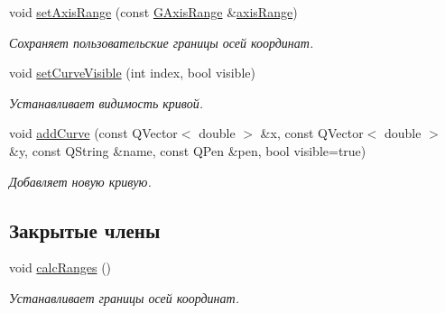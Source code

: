 \begin{DoxyCompactItemize}
\hypertarget{class_graph_sheet_ae37cc5b56c35ae34ced47c6f21eebf45}{}\label{class_graph_sheet_ae37cc5b56c35ae34ced47c6f21eebf45} 
void \hyperlink{class_graph_sheet_ae37cc5b56c35ae34ced47c6f21eebf45}{set\+Axis\+Range} (const \hyperlink{struct_g_axis_range}{G\+Axis\+Range} \&\hyperlink{class_graph_sheet_ac13787fb3357ea7d4f3ee3aa4351b0d7}{axis\+Range})
\begin{DoxyCompactList}\small\item\em Сохраняет пользовательские границы осей координат. \end{DoxyCompactList}\item 
void \hyperlink{class_graph_sheet_af8f3efaf2a6ba860b089bef15e07f403}{set\+Curve\+Visible} (int index, bool visible)
\begin{DoxyCompactList}\small\item\em Устанавливает видимость кривой. \end{DoxyCompactList}\item 
void \hyperlink{class_graph_sheet_abce999772aca9f5da197f13fd8912362}{add\+Curve} (const Q\+Vector$<$ double $>$ \&x, const Q\+Vector$<$ double $>$ \&y, const Q\+String \&name, const Q\+Pen \&pen, bool visible=true)
\begin{DoxyCompactList}\small\item\em Добавляет новую кривую. \end{DoxyCompactList}\end{DoxyCompactItemize}
\subsection*{Закрытые члены}
\begin{DoxyCompactItemize}
\item 
void \hyperlink{class_graph_sheet_adc73499b0d6b96dde2e3d1f829ec6273}{calc\+Ranges} ()
\begin{DoxyCompactList}\small\item\em Устанавливает границы осей координат. \end{DoxyCompactList}\end{DoxyCompactItemize}
